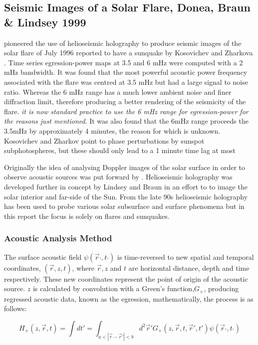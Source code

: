 \subsection{Seismic Images of a Solar Flare, Donea, Braun & Lindsey 1999}
\cite{1999ApJ...513L.143D} pioneered the use of helioseismic holography to produce seismic images of the solar flare of July 1996 reported to have a sunquake by Kosovichev and Zharkova \citep{1998Natur.393..317K}. Time series egression-power maps at 3.5 and 6 mHz were computed with a 2 mHz bandwidth. It was found that the most powerful acoustic power frequency associated with the flare was centred at 3.5 mHz but had a large signal to noise ratio. Whereas the 6 mHz range has a much lower ambient noise and finer diffraction limit, therefore producing a better rendering of the seismicity of the flare. \emph{it is now standard practice to use the 6 mHz range for egression-power for the reasons just mentioned}. It was also found that the 6mHz range proceeds the 3.5mHz by approximately 4 minutes, the reason for which is unknown. Kosovichev and Zharkov point to phase perturbations by sunspot subphotospheres, but these should only lead to a 1 minute time lag at most

Originally the idea of analysing Doppler images of the solar surface in order to observe acoustic sources was put forward by \cite{1975CRASB.281...93R}. Helioseismic holography was developed further in concept by Lindsey and Braun \citep{1990SoPh..126..101L, 1992ApJ...392..739B, 1997ApJ...485..895L } in an effort to to image the solar interior and far-side of the Sun. From the late 90s helioseismic holography has been used to probe various solar subsurface and surface phenomena but in this report the focus is solely on flares and sunquakes. 

\subsubsection{Acoustic Analysis Method}
The surface acoustic field $\psi(\vec{r}_{'},t_{'})$ is time-reversed to new spatial and temporal coordinates, $(\vec{r},z,t)$, where $\vec{r}, z$ and $t$ are horizontal distance, depth and time respectively. These new coordinates represent the point of origin of the acoustic source. $z$ is calculated by convolution with a Green's function,$G_{+}$, producing regressed acoustic data, known as the egression, mathematically, the process is as follows:

\begin{equation}\label{helioholo}  
H_{+}(z,\vec{r},t)= \int dt' = \int_{a<|\vec{r}-\vec{r}'|<b} d^{2}\vec{r}'G_{+}(z,\vec{r},t,\vec{r}',t')\psi(\vec{r}_{'},t_{'}) 
\end{equation}

